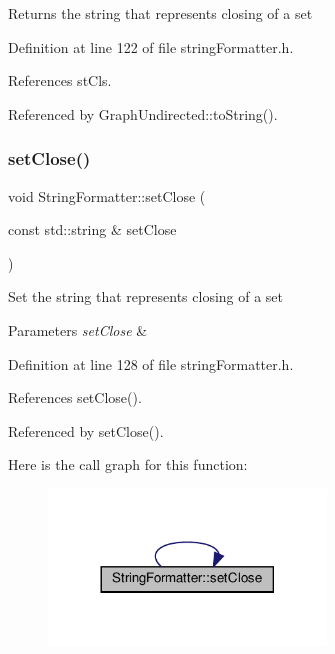 \begin{DoxyReturn}{Returns}
the string that represents closing of a set 
\end{DoxyReturn}


Definition at line 122 of file string\+Formatter.\+h.



References st\+Cls.



Referenced by Graph\+Undirected\+::to\+String().

\mbox{\label{classStringFormatter_a25e503d8ea3bf513abfe1bbe36f0953e}} 
\subsubsection{\texorpdfstring{set\+Close()}{setClose()}\hspace{0.1cm}{\footnotesize\ttfamily [2/2]}}
{\footnotesize\ttfamily void String\+Formatter\+::set\+Close (\begin{DoxyParamCaption}\item[{const std\+::string \&}]{set\+Close }\end{DoxyParamCaption})\hspace{0.3cm}{\ttfamily [inline]}}

Set the string that represents closing of a set 
\begin{DoxyParams}{Parameters}
{\em set\+Close} & \\
\hline
\end{DoxyParams}


Definition at line 128 of file string\+Formatter.\+h.



References set\+Close().



Referenced by set\+Close().

Here is the call graph for this function\+:
\nopagebreak
\begin{figure}[H]
\begin{center}
\leavevmode
\includegraphics[width=209pt]{classStringFormatter_a25e503d8ea3bf513abfe1bbe36f0953e_cgraph}
\end{center}
\end{figure}
\mbox{\label{classStringFormatter_a138f0dfbbbbf629aab40b9816b075900}} 
